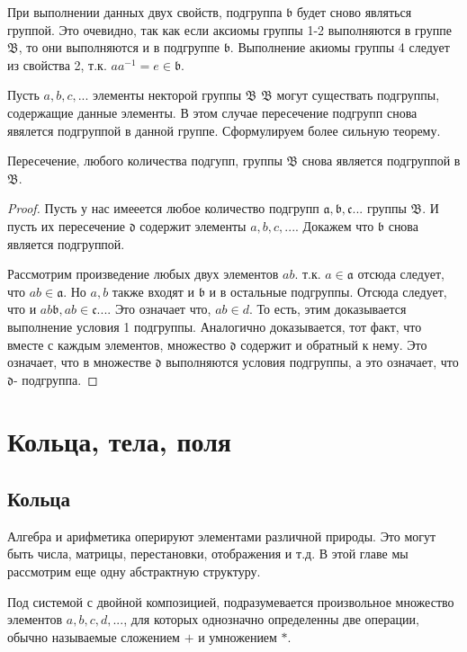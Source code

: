 {При выполнении данных двух свойств, подгруппа $\mathfrak {b}$ будет сново являться группой. Это очевидно, так как если аксиомы группы 1-2 выполняются в группе $\mathfrak {B}$, то они выполняются и в подгруппе $\mathfrak {b}$. Выполнение акиомы группы 4 следует из свойства 2, т.к. $aa^{-1}=e \in \mathfrak {b}.$ 

Пусть $a,b,c,... $  элементы некторой группы $\mathfrak {B}$ $\mathfrak {B}$ могут существать подгруппы, содержащие данные элементы. В этом случае пересечение подгрупп снова явялется подгруппой в данной группе. Сформулируем более сильную теорему.

\begin{Lem}
Пересечение, любого количества подгупп, группы $\mathfrak {B}$ снова является подгруппой в $\mathfrak {B}$.
\end{Lem}
\begin{proof}
Пусть у нас имееется любое количество подгрупп $\mathfrak {a}, \mathfrak {b}, \mathfrak {c}...$ группы $\mathfrak {B}$. И пусть их пересечение $\mathfrak {d}$ содержит элементы $a,b,c,...$.
Докажем что $\mathfrak {b}$ снова является подгруппой.

Рассмотрим произведение любых двух элементов $ab$. т.к. $a \in \mathfrak {a}$ отсюда следует, что $ab \in \mathfrak {a}$. Но $a,b$ также входят и $\mathfrak {b}$ и в остальные подгруппы. Отсюда следует, что и $ab \mathfrak {b}, ab \in \mathfrak {c}...$. Это означает что, $ab \in {d}$. То есть, этим доказывается выполнение условия 1 подгруппы. Аналогично доказывается, тот факт, что вместе с каждым элементов, множество $\mathfrak {d}$ содержит и обратный к нему. Это означает, что в множестве $\mathfrak {d}$ выполняются условия подгруппы, а это означает, что $\mathfrak {d}$- подгруппа.    
\end{proof}
}
\section{Кольца, тела, поля}
{
\subsection{Кольца}
Алгебра и арифметика оперируют элементами различной природы. Это могут быть числа, матрицы, перестановки, отображения и т.д.
В этой главе мы рассмотрим еще одну абстрактную структуру. 

Под системой с двойной композицией, подразумевается произвольное множество элементов $a,b,c,d,...$, для которых однозначно определенны две операции, обычно называемые сложением $+ $ и умножением $*$.
}
